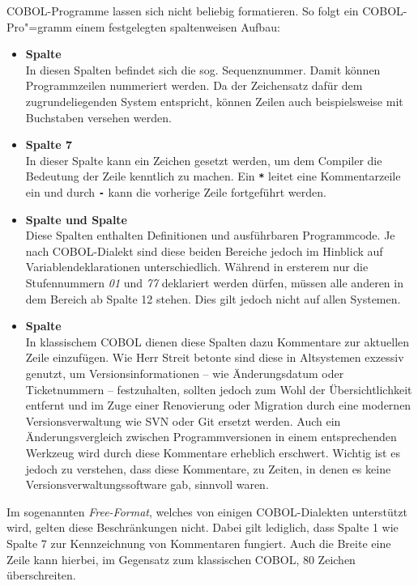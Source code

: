 COBOL-Programme lassen sich nicht beliebig formatieren. So folgt ein COBOL-Pro"=gramm einem festgelegten spaltenweisen Aufbau:
\begin{itemize}
    \item \textbf{Spalte }\\
    In diesen Spalten befindet sich die sog. Sequenznummer. Damit können Programmzeilen nummeriert werden. Da der Zeichensatz dafür dem zugrundeliegenden System entspricht, können Zeilen auch beispielsweise mit Buchstaben versehen werden.
    \item \textbf{Spalte 7}\\
    In dieser Spalte kann ein Zeichen gesetzt werden, um dem Compiler die Bedeutung der Zeile kenntlich zu machen. Ein {\tt\textbf{*}} leitet \zB eine Kommentarzeile ein und durch {\tt\textbf{-}} kann die vorherige Zeile fortgeführt werden.
    \item \textbf{Spalte  und Spalte }\\
    Diese Spalten enthalten Definitionen und ausführbaren Programmcode. Je nach COBOL-Dialekt sind diese beiden Bereiche jedoch im Hinblick auf Variablendeklarationen unterschiedlich. Während in ersterem nur die Stufennummern \textit{01} und \textit{77} deklariert werden dürfen, müssen alle anderen in dem Bereich ab Spalte 12 stehen. Dies gilt jedoch nicht auf allen Systemen.
    \item \textbf{Spalte }\\
    In klassischem COBOL dienen diese Spalten dazu Kommentare zur aktuellen Zeile einzufügen. Wie Herr Streit betonte sind diese in Altsystemen exzessiv genutzt, um Versionsinformationen -- wie Änderungsdatum oder Ticketnummern -- festzuhalten, sollten jedoch zum Wohl der Übersichtlichkeit entfernt und im Zuge einer Renovierung oder Migration durch eine modernen Versionsverwaltung wie \zB SVN oder Git ersetzt werden. Auch ein Änderungsvergleich zwischen Programmversionen in einem entsprechenden Werkzeug wird durch diese Kommentare erheblich erschwert. Wichtig ist es jedoch zu verstehen, dass diese Kommentare, zu Zeiten, in denen es keine Versionsverwaltungssoftware gab, sinnvoll waren.
\end{itemize}

Im sogenannten \textit{Free-Format}, welches von einigen COBOL-Dialekten unterstützt wird, gelten diese Beschränkungen nicht. Dabei gilt lediglich, dass Spalte 1 wie Spalte 7 zur Kennzeichnung von Kommentaren fungiert. Auch die Breite eine Zeile kann hierbei, im Gegensatz zum klassischen COBOL, 80 Zeichen überschreiten. 